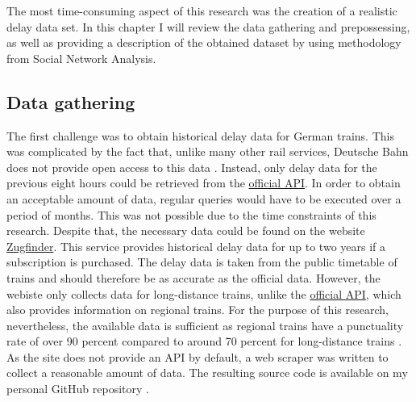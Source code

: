 \documentclass[12pt,a4paper]{article}
\begin{document}
The most time-consuming aspect of this research was the creation of a realistic delay data set. 
In this chapter I will review the data gathering and prepossessing, as well as providing a description of the obtained dataset by using methodology from Social Network Analysis.

\maketitle
\subsection{\label{sec:Gathering}Data gathering}

The first challenge was to obtain historical delay data for German trains. This was complicated by the fact that, unlike many other rail services, Deutsche Bahn does not provide open access to this data \citep[p.~5]{Spanninger2022}. 
Instead, only delay data for the previous eight hours could be retrieved from the \href{https://developers.deutschebahn.com/db-api-marketplace/apis/frontpage}{official API}. 
In order to obtain an acceptable amount of data, regular queries would have to be executed over a period of months. This was not possible due to the time constraints of this research. 
Despite that, the necessary data could be found on the website \href{https://www.zugfinder.net/en/start}{Zugfinder}. This service provides historical delay data for up to two years if a subscription is purchased. 
The delay data is taken from the public timetable of trains and should therefore be as accurate as the official data. However, the webiste only collects data for long-distance trains, unlike the \href{https://developers.deutschebahn.com/db-api-marketplace/apis/frontpage}{official API}, which also provides information on regional trains. 
For the purpose of this research, nevertheless, the available data is sufficient as regional trains have a punctuality rate of over 90 percent compared to around 70 percent for long-distance trains \citep{DBPunctuality2024}. 
As the site does not provide an API by default, a web scraper was written to collect a reasonable amount of data. The resulting source code is available on my personal GitHub repository \citep{repo}. 
\end{document}
